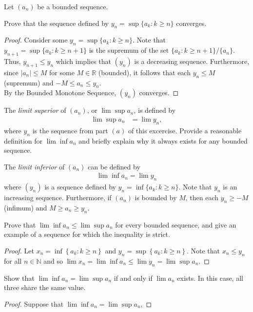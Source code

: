 \documentclass[12pt]{article}
\newcommand{\N}{\mathbb{N}}
\newcommand{\R}{\mathbb{R}}
\newenvironment{problem}[2][Problem]{\begin{trivlist} \item[\hskip \labelsep {\bfseries #1}\hskip \labelsep {\bfseries #2.}]}{\end{trivlist}}
\newenvironment{solution}[1][Solution]{\begin{trivlist} \item[\hskip \labelsep {\bfseries #1}]}{\end{trivlist}}
\begin{document}
\begin{problem}{2.4.7 (Limit Superior)}
  Let $(a_{n})$ be a bounded sequence.
\begin{enumerate}
  \item Prove that the sequence defined by $y_{n}=\sup\{a_{k}:k\geq n\}$ converges.
\begin{proof}
  Consider some $y_{n}=\sup\{a_{k}:k\geq n\}$. Note that $y_{n+1}=\sup\{a_{k}:k\geq n+1\}$ is the supremum of the set $\{a_{k}:k\geq n+1\}/\{a_{n}\}$. Thus, $y_{n+1}\leq y_{n}$ which implies that $(y_{n})$ is a decreasing sequence. Furthermore, since $|a_{n}|\leq M$ for some $M\in \R$ (bounded), it follows that each $y_{n}\leq M$ (supremum) and $-M\leq a_{n} \leq y_{n}$. \\
  By the Bounded Monotone Sequence, $(y_{n})$ converges.
\end{proof}
  \item The \textit{limit superior} of $(a_{n})$, or $\lim\sup a_{n}$, is defined by
\begin{align*}
  \lim\sup a_{n} &= \lim y_{n},
\end{align*}
where $y_{n}$ is the sequence from part $(a)$ of this excercise. Provide a reasonable definition for $\lim\inf a_{n}$ and briefly explain why it always exists for any bounded sequence.
\begin{solution}
  The \textit{limit inferior} of $(a_{n})$ can be defined by  
\begin{align*}
  \lim\inf a_{n} = \lim y_{n}
\end{align*}
where $(y_{n})$ is a sequence defined by $y_{n} = \inf\{a_{k}:k\geq n\}$. Note that $y_{n}$ is an increasing sequence. Furthermore, if $(a_{n})$ is bounded by $M$, then each $y_{n}\geq -M$ (infimum) and $M\geq a_{n} \geq y_{n}$.
\end{solution}
\item Prove that $\lim\inf a_{n} \leq \lim\sup a_{n}$ for every bounded sequence, and give an example of a sequence for which the inequality is strict.
\begin{proof}
  Let $x_{n} = \inf\left\{ a_{k}:k\geq n \right\}$ and $y_{n} = \sup\left\{ a_{k}:k\geq n \right\}$. Note that $x_{n} \leq y_{n}$ for all $n\in \N$ and so $\lim x_{n} = \lim\inf a_{n} \leq \lim y_{n}= \lim\sup a_{n}$.
\end{proof}
\item Show that $\lim\inf a_{n} = \lim\sup a_{n}$ if and only if $\lim a_{n}$ exists. In this case, all three share the same value. 
\begin{proof}
  Suppose that $\lim\inf a_{n} = \lim\sup a_{n}$, 
\end{proof}
\end{enumerate}
\end{problem}
\end{document}
